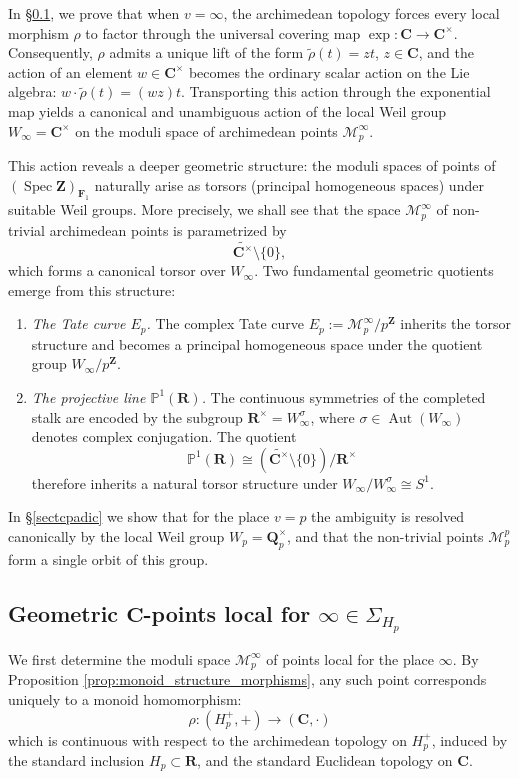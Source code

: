 \documentclass[11pt,a4paper]{article}
\newcommand{\C}{\mathbf{C}}
\newcommand{\Q}{\mathbf{Q}}
\newcommand{\R}{\mathbf{R}}
\newcommand{\Z}{\mathbf{Z}}
\def\spzf{(\Spec \Z)_{\mathbf{F}_{1}}}
\newcommand{\Spec}{\operatorname{Spec}}
\begin{document}
In \S\ref{sectarch}, we prove that when $v=\infty$, the archimedean topology forces every local morphism $\rho$ to factor through the universal covering map
$
\exp:\C\longrightarrow\C^\times$.
Consequently, $\rho$ admits a unique lift of the form
$
\widetilde{\rho}(t)=zt$,
$z\in\C$, 
and the action of an element $w\in\C^\times$ becomes the ordinary scalar action on the Lie algebra:
$w\cdot\widetilde{\rho}(t)=(wz)t$.
Transporting this action through the exponential map yields a canonical and unambiguous action of the local Weil group
$
W_\infty=\C^\times
$
on the moduli space of archimedean points $\mathcal M_p^\infty$.

This action reveals a deeper geometric structure: the moduli spaces of points of $\spzf$ naturally arise as torsors (principal homogeneous spaces) under suitable Weil groups. More precisely, we shall see that the space
$\mathcal M_p^\infty$
of non-trivial archimedean points is parametrized by
\[
\widetilde{\C^\times}\setminus\{0\},
\]
which forms a canonical torsor over $W_\infty$. Two fundamental geometric quotients emerge from this structure:
\begin{enumerate}
\item \emph{The Tate curve $E_p$.}
The complex Tate curve
$E_p:=\mathcal M_p^\infty/p^\Z$
inherits the torsor structure and becomes a principal homogeneous space under the quotient group
$W_\infty/p^\Z$.

\item \emph{The projective line $\mathbb P^1(\R)$.}
The continuous symmetries of the completed stalk are encoded by the subgroup
$\R^\times=W_\infty^\sigma$,
where $\sigma\in\operatorname{Aut}(W_\infty)$ denotes complex conjugation. The quotient
\[
\mathbb P^1(\R)
\cong
(\widetilde{\C^\times}\setminus\{0\})/\R^\times
\]
therefore inherits a natural torsor structure under
$W_\infty/W_\infty^\sigma
\cong S^1$.
\end{enumerate}

In \S \ref{sectcpadic} we show that for the place $v=p$ the ambiguity is resolved canonically by the local Weil group $W_p=\Q_p^\times$, and that the non-trivial points  $\mathcal{M}_{p}^{p}$ form a single orbit of this group.


\subsection{Geometric $\C$-points  local for  $\infty\in \Sigma_{H_p}$}\label{sectarch}

 We first determine the moduli space $\mathcal M_p^\infty$ of  points local for the place $\infty$.
 By Proposition \ref{prop:monoid_structure_morphisms}, any such point corresponds uniquely to a monoid homomorphism:
\[
\rho : (H_p^+, +) \longrightarrow (\C, \cdot)
\]
which is continuous with respect to the archimedean topology on $H_p^+$, induced by the standard inclusion $H_p\subset \R$, and the standard Euclidean topology on $\C$.
\end{document}
